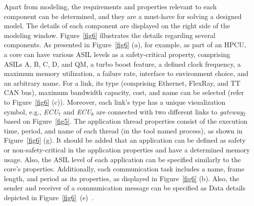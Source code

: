 
 
    Apart from modeling, the requirements and properties relevant to each component can be determined, and they are a must-have for solving a designed model. The details of each component are displayed on the right side of the modeling window. Figure~\ref{fig6} illustrates the details regarding several components. As presented in Figure~\ref{fig6} (a), for example, as part of an HPCU, a core can have various ASIL levels as a safety-critical property, comprising ASILs A, B, C, D, and QM, a turbo boost feature, a defined clock frequency, a maximum memory utilization, a failure rate, interface to environment choice, and an arbitrary name. For a link, its type (comprising Ethernet, FlexRay, and TT CAN bus), maximum bandwidth capacity, cost, and name can be selected (refer to Figure~\ref{fig6} (c)). Moreover, each link's type has a unique visualization symbol, e.g., \textit{ECU$_7$} and \textit{ECU$_8$} are connected with two different links to \textit{gateway$_2$} based on Figure~\ref{fig5}. The application thread properties consist of the execution time, period, and name of each thread (in the tool named process), as shown in Figure~\ref{fig6} (g). It should be added that an application can be defined as safety or non-safety-critical in the application properties and have a determined memory usage. Also, the ASIL level of each application can be specified similarly to the core's properties. Additionally, each communication task includes a name, frame length, and period as its properties, as displayed in Figure~\ref{fig6} (b). Also, the sender and receiver of a communication message can be specified as Data details depicted in Figure~\ref{fig6}~(e)~\cite{askaripoor2023designer}. 
 
